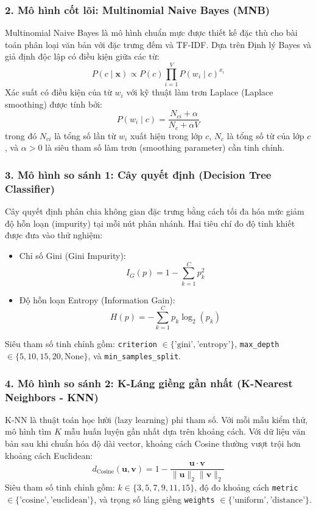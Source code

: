 \documentclass[12pt,a4paper]{article}
\begin{document}
\subsubsection{2. Mô hình cốt lõi: Multinomial Naive Bayes (MNB)}
Multinomial Naive Bayes là mô hình chuẩn mực được thiết kế đặc thù cho bài toán phân loại văn bản với đặc trưng đếm và TF-IDF. Dựa trên Định lý Bayes và giả định độc lập có điều kiện giữa các từ:
\begin{equation}
    P(c \mid \mathbf{x}) \propto P(c) \prod_{i=1}^{V} P(w_i \mid c)^{x_i}
\end{equation}
Xác suất có điều kiện của từ $w_i$ với kỹ thuật làm trơn Laplace (Laplace smoothing) được tính bởi:
\begin{equation}
    P(w_i \mid c) = \frac{N_{ci} + \alpha}{N_c + \alpha V}
\end{equation}
trong đó $N_{ci}$ là tổng số lần từ $w_i$ xuất hiện trong lớp $c$, $N_c$ là tổng số từ của lớp $c$, và $\alpha > 0$ là siêu tham số làm trơn (smoothing parameter) cần tinh chỉnh.

\subsubsection{3. Mô hình so sánh 1: Cây quyết định (Decision Tree Classifier)}
Cây quyết định phân chia không gian đặc trưng bằng cách tối đa hóa mức giảm độ hỗn loạn (impurity) tại mỗi nút phân nhánh. Hai tiêu chí đo độ tinh khiết được đưa vào thử nghiệm:
\begin{itemize}
    \item Chỉ số Gini (Gini Impurity):
    \begin{equation}
        I_G(p) = 1 - \sum_{k=1}^{C} p_k^2
    \end{equation}
    \item Độ hỗn loạn Entropy (Information Gain):
    \begin{equation}
        H(p) = -\sum_{k=1}^{C} p_k \log_2(p_k)
    \end{equation}
\end{itemize}
Siêu tham số tinh chỉnh gồm: \texttt{criterion} $\in \{\text{'gini'}, \text{'entropy'}\}$, \texttt{max\_depth} $\in \{5, 10, 15, 20, \text{None}\}$, và \texttt{min\_samples\_split}.

\subsubsection{4. Mô hình so sánh 2: K-Láng giềng gần nhất (K-Nearest Neighbors - KNN)}
K-NN là thuật toán học lười (lazy learning) phi tham số. Với mỗi mẫu kiểm thử, mô hình tìm $K$ mẫu huấn luyện gần nhất dựa trên khoảng cách. Với dữ liệu văn bản sau khi chuẩn hóa độ dài vector, khoảng cách Cosine thường vượt trội hơn khoảng cách Euclidean:
\begin{equation}
    d_{\text{Cosine}}(\mathbf{u}, \mathbf{v}) = 1 - \frac{\mathbf{u} \cdot \mathbf{v}}{\|\mathbf{u}\|_2 \|\mathbf{v}\|_2}
\end{equation}
Siêu tham số tinh chỉnh gồm: $k \in \{3, 5, 7, 9, 11, 15\}$, độ đo khoảng cách \texttt{metric} $\in \{\text{'cosine'}, \text{'euclidean'}\}$, và trọng số láng giềng \texttt{weights} $\in \{\text{'uniform'}, \text{'distance'}\}$.
\end{document}
